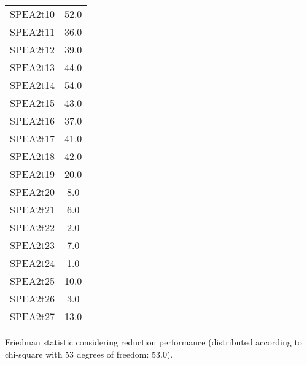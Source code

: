 \documentclass{article}
\begin{document}
\begin{table}[!htp]
\begin{tabular}{c|c}
SPEA2t10&52.0\\
SPEA2t11&36.0\\
SPEA2t12&39.0\\
SPEA2t13&44.0\\
SPEA2t14&54.0\\
SPEA2t15&43.0\\
SPEA2t16&37.0\\
SPEA2t17&41.0\\
SPEA2t18&42.0\\
SPEA2t19&20.0\\
SPEA2t20&8.0\\
SPEA2t21&6.0\\
SPEA2t22&2.0\\
SPEA2t23&7.0\\
SPEA2t24&1.0\\
SPEA2t25&10.0\\
SPEA2t26&3.0\\
SPEA2t27&13.0\\
\end{tabular}
\end{table}


Friedman statistic considering reduction performance (distributed according to chi-square with 53 degrees of freedom: 53.0).
\end{document}
